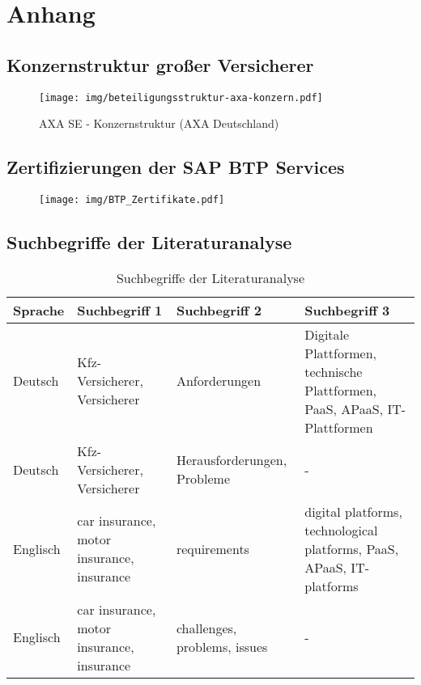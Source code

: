 \chapter{Anhang}\label{anhang}

\section{Konzernstruktur großer Versicherer}
\label{sec:KonzernStrukturen}

\begin{figure}[h]
  \centering
  \texttt{[image: img/beteiligungsstruktur-axa-konzern.pdf]}
  \caption[]{AXA SE - Konzernstruktur (AXA Deutschland)}
  \label{fig:AXAKstr}
\end{figure}
\newpage

\section{Zertifizierungen der SAP BTP Services}
\begin{figure}[h]
    \centering
    \texttt{[image: img/BTP\_Zertifikate.pdf]}
    \label{fig:BTPZertifikate}
  \end{figure}
\newpage


\section{Suchbegriffe der Literaturanalyse}
\begin{table}[ht]
    \begin{center}
    \begin{tabular}{|p{3cm}|p{3cm}|p{}|p{}|}
        \hline Sprache & Suchbegriff 1 & Suchbegriff 2 & Suchbegriff 3\\[0.5ex]
        \hline Deutsch & Kfz-Versicherer, Versicherer & Anforderungen & Digitale Plattformen, technische Plattformen, PaaS, APaaS, IT-Plattformen\\
        \hline Deutsch & Kfz-Versicherer, Versicherer & Herausforderungen, Probleme & -\\
        \hline Englisch & car insurance, motor insurance, insurance & requirements & digital platforms, technological platforms, PaaS, APaaS, IT-platforms\\
        \hline Englisch & car insurance, motor insurance, insurance & challenges, problems, issues & -\\
        \hline
    \end{tabular}
    \end{center}
    \caption{Suchbegriffe der Literaturanalyse}
    \label{tab:suchbegriffe}
\end{table}  

